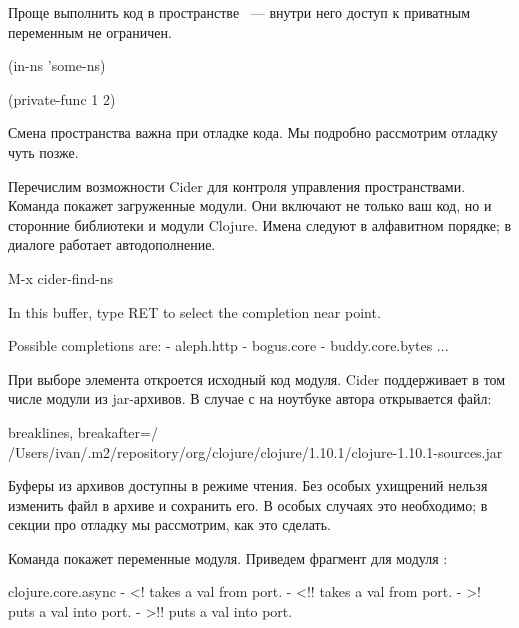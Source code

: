 Проще выполнить код в пространстве ~--- внутри него доступ к приватным переменным не ограничен.

\begin{english}
  \begin{clojure}
(in-ns 'some-ns)

(private-func 1 2)
  \end{clojure}
\end{english}

\pagebreaklarge

Смена пространства важна при отладке кода. Мы подробно рассмотрим отладку чуть позже.

Перечислим возможности Cider для контроля управления пространствами. Команда  покажет загруженные модули. Они включают не только ваш код, но и сторонние библиотеки и модули Clojure. Имена следуют в алфавитном порядке; в диалоге работает автодополнение.

\begin{english}
  \begin{text}
M-x cider-find-ns

In this buffer, type RET to select the completion
near point.

Possible completions are:
- aleph.http
- bogus.core
- buddy.core.bytes
...
  \end{text}
\end{english}

При выборе элемента откроется исходный код модуля. Cider поддерживает в том числе модули из jar-архивов. В случае с  на ноутбуке автора открывается файл:

\begin{english}
  \begin{text*}{breaklines, breakafter=/}
/Users/ivan/.m2/repository/org/clojure/clojure/1.10.1/clojure-1.10.1-sources.jar
  \end{text*}
\end{english}

Буферы из архивов доступны в режиме чтения. Без особых ухищрений нельзя изменить файл в архиве и сохранить его. В особых случаях это необходимо; в секции про отладку мы рассмотрим, как это сделать.

Команда  покажет переменные модуля. Приведем фрагмент для модуля :

\begin{english}
  \begin{clojure}
clojure.core.async
- <! takes a val from port.
- <!! takes a val from port.
- >! puts a val into port.
- >!! puts a val into port.
  \end{clojure}
\end{english}

